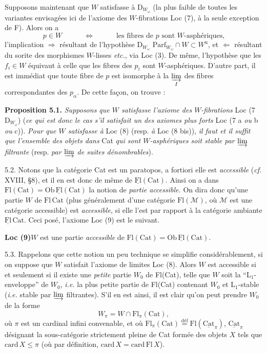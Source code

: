 \documentclass[11pt]{article}
\newcommand{\printedpage}[1]{\marginpar{\footnotesize p.~#1}}
\newcommand{\msp}[1]{\marginpar{\footnotesize [#1]}}
\newcommand{\Parf}{\mathrm{Parf}}
\newcommand{\uFl}{\underline{\mathrm{Fl}}}
\newcommand{\uCat}{\underline{\mathrm{Cat}}}
\begin{document}
Supposons maintenant que $W$ satisfasse à $\mathrm{D}_{W_\omega}$ (la plus faible de toutes les variantes envisagées ici de l'axiome des $W$-fibrations Loc (7), à la seule exception de F). Alors on a
\[
p \in W \qquad\quad \Longleftrightarrow \qquad\quad \text{les fibres de $p$ sont $W$-asphériques,}
\]
\printedpage{41}
l'implication $\Longrightarrow$ résultant de l'hypothèse $\mathrm{D}_{W_\omega}$ $\Parf_{W_\omega} \cap W \subset W^{\mathrm{u}}$, et $\Longleftarrow$ résultant du sorite des morphismes $W$-lisses \textit{etc.}, via Loc (3). De même, l'hypothèse que les $f_i \in W$ équivaut à celle que les fibres des $p_i$ sont $W$-asphériques. D'autre part, il est immédiat que
\msp{page 74}
toute fibre de $p$ est isomorphe à la $\varinjlim\limits_{I}$ des fibres correspondantes des $p_\alpha$. De cette façon, on trouve :

\textbf{Proposition 5.1.} \textit{Supposons que $W$ satisfasse l'axiome des $W$-fibrations} Loc (7 $\mathrm{D}_{W_\omega}$) (\textit{ce qui est donc le cas s'il satisfait un des axiomes plus forts} Loc (7 a \textit{ou} b \textit{ou} c)). \textit{Pour que $W$ satisfasse à} Loc (8) (resp. \textit{à} Loc (8 bis)), \textit{il faut et il suffit que l'ensemble des objets dans} Cat \textit{qui sont $W$-asphériques soit stable par $\varinjlim$ filtrante} (resp. \textit{par $\varinjlim$ de suites dénombrables}).

5.2. Notons que la catégorie Cat est un paratopos, a fortiori elle est \textit{accessible} (\textit{cf.} XVIII, §8), et il en est donc de même de $\uFl(\mathrm{Cat})$. Ainsi on a dans $\mathrm{Fl}(\mathrm{Cat}) = \mathrm{Ob}\,\uFl(\mathrm{Cat})$ la notion de \textit{partie accessible.} On dira donc qu'une partie $W$ de $\mathrm{Fl}\,\mathrm{Cat}$ (plus généralement d'une catégorie $\mathrm{Fl}(\mathcal{M})$, où $\mathcal{M}$ est une catégorie accessible) est \textit{accessible,} si elle l'est par rapport à la catégorie ambiante
\msp{page 75}
$\uFl\,\mathrm{Cat}$. Ceci posé, l'axiome Loc (9) est le suivant.

\textbf{Loc (9)}\quad $W$ est une partie \textit{accessible} de $\mathrm{Fl}(\mathrm{Cat}) = \mathrm{Ob}\,\uFl(\mathrm{Cat})$.

5.3. Rappelons que cette notion un peu technique se simplifie considérablement, si on suppose que $W$ satisfait l'axiome de limites Loc (8). Alors $W$ est accessible si et seulement si il existe une \textit{petite} partie $W_0$ de Fl(Cat), telle que $W$ soit la ``L$_1$-enveloppe'' de $W_0$, \textit{i.e.} la plus petite partie de Fl(Cat) contenant $W_0$ et L$_1$-stable (\textit{i.e.} stable par $\varinjlim$ filtrantes). S'il en est ainsi, il est clair qu'on peut prendre $W_0$ de la forme
\[
W_\pi = W \cap \mathrm{Fl}_\pi(\mathrm{Cat}),
\]
où $\pi$ est un cardinal infini convenable, et où $\mathrm{Fl}_\pi(\mathrm{Cat}) \overset{\text{déf}}{=} \mathrm{Fl}(\uCat_\pi)$, $\uCat_\pi$ désignant la sous-catégorie strictement pleine de Cat formée des objets $X$ tels que $\mathrm{card}\,X \leq \pi$ (où par définition, $\mathrm{card}\,X = \mathrm{card}\,\mathrm{Fl}\,X$).
\end{document}
